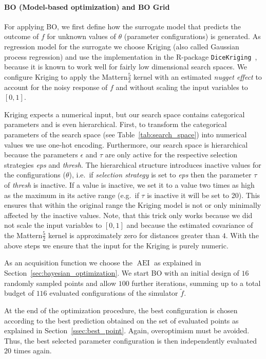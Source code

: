 \documentclass[bimj,fleqn]{w-art}
\theoremstyle{plain}
\theoremstyle{definition}
\begin{document}
\paragraph{BO (Model-based optimization) and BO Grid}
For applying BO, we first define how the surrogate model that predicts the outcome of $f$ for unknown values of $\theta$ (parameter configurations) is generated.
As regression model for the surrogate we choose Kriging (also called Gaussian process regression) and use the implementation in the R-package \texttt{DiceKriging}~\citep{roustant_dicekriging_2012}, because it is known to work well for fairly low dimensional search spaces.
We configure Kriging to apply the Mattern$\frac{5}{2}$ kernel with an estimated \emph{nugget effect} to account for the noisy response of $f$ and without scaling the input variables to $[0,1]$.

Kriging expects a numerical input, but our search space contains categorical parameters and is even hierarchical.
First, to transform the categorical parameters of the search space (see Table~\ref{tab:search_space}) into numerical values we use one-hot encoding.
Furthermore, our search space is hierarchical because the parameters $\epsilon$ and $\tau$ are only active for the respective selection strategies \emph{eps} and \emph{thresh}.
The hierarchical structure introduces inactive values for the configurations ($\theta$), i.e.\ if \emph{selection strategy} is set to \emph{eps} then the parameter $\tau$ of \emph{thresh} is inactive.
If a value is inactive, we set it to a value two times as high as the maximum in its active range (e.g.\ if $\tau$ is inactive it will be set to 20).
This ensures that within the original range the Kriging model is not or only minimally affected by the inactive values.
Note, that this trick only works because we did not scale the input variables to $[0,1]$ and because the estimated covariance of the Mattern$\frac{5}{2}$ kernel is approximately zero for distances greater than $4$.
With the above steps we ensure that the input for the Kriging is purely numeric.

As an acquisition function we choose the $\operatorname{AEI}$ as explained in Section~\ref{sec:bayesian_optimization}.
We start BO with an initial design of $16$ randomly sampled points and allow $100$ further iterations, summing up to a total budget of $116$ evaluated configurations of the simulator $\tilde{f}$.

At the end of the optimization procedure, the best configuration is chosen according to the best prediction obtained on the set of evaluated points as explained in Section~\ref{ssec:best_point}.
Again, overoptimism must be avoided. 
Thus, the best selected parameter configuration is then independently evaluated $20$ times again.
\end{document}
